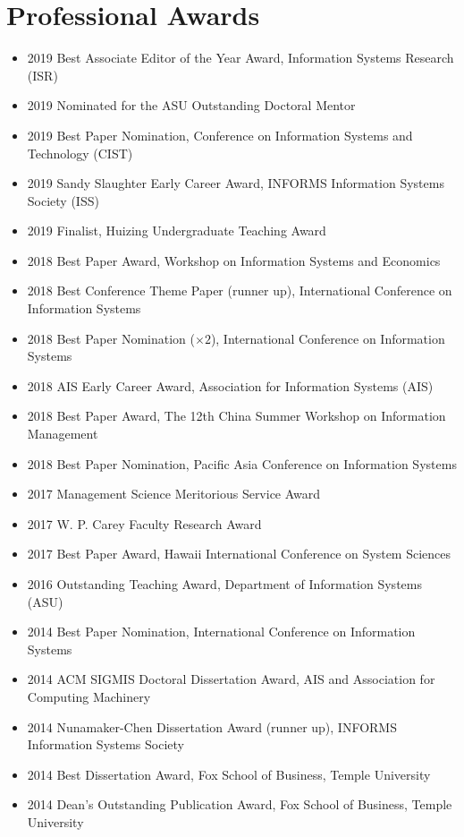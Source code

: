\documentclass[paper=letter,fontsize=10pt]{scrartcl} %
\newcommand{\NewPart}[2]{\section*{{#1} #2}}
\begin{document}
\NewPart{Professional Awards}{}
\begin{itemize}
\item 2019 Best Associate Editor of the Year Award, Information Systems Research (ISR)
\item 2019 Nominated for the ASU Outstanding Doctoral Mentor
\item 2019 Best Paper Nomination, Conference on Information Systems and Technology (CIST)
\item 2019 Sandy Slaughter Early Career Award, INFORMS Information Systems Society (ISS)
\item 2019 Finalist, Huizing Undergraduate Teaching Award
\item 2018 Best Paper Award, Workshop on Information Systems and Economics
\item 2018 Best Conference Theme Paper (runner up), International Conference on Information Systems
\item 2018 Best Paper Nomination ($\times2$), International Conference on Information Systems
\item 2018 AIS Early Career Award, Association for Information Systems (AIS)
\item 2018 Best Paper Award, The 12th China Summer Workshop on Information Management
\item 2018 Best Paper Nomination, Pacific Asia Conference on Information Systems
\item 2017 Management Science Meritorious Service Award
\item 2017 W. P. Carey Faculty Research Award
\item 2017 Best Paper Award, Hawaii International Conference on System Sciences
\item 2016 Outstanding Teaching Award, Department of Information Systems (ASU)
\item 2014 Best Paper Nomination, International Conference on Information Systems
\item 2014 ACM SIGMIS Doctoral Dissertation Award, AIS and Association for Computing Machinery
\item 2014 Nunamaker-Chen Dissertation Award (runner up), INFORMS Information Systems Society
\item 2014 Best Dissertation Award, Fox School of Business, Temple University
\item 2014 Dean's Outstanding Publication Award, Fox School of Business, Temple University

\end{itemize}
\end{document}
